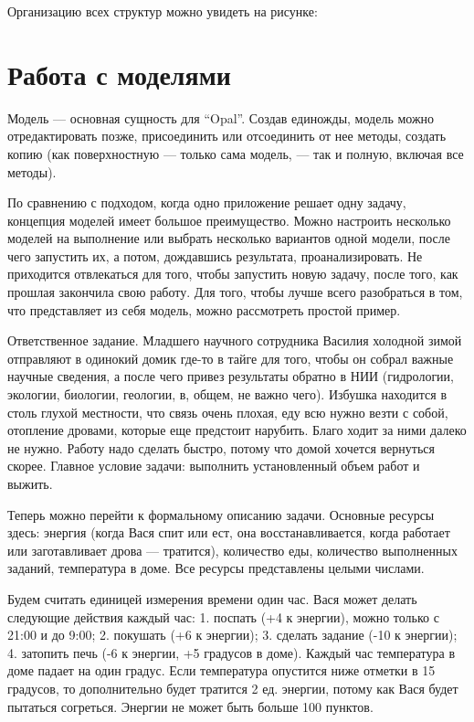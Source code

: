 Организацию всех структур можно увидеть на рисунке:

\section{Работа с моделями}

Модель — основная сущность для “Opal”. Создав единожды, модель можно отредактировать позже, присоединить или отсоединить от нее методы, создать копию (как поверхностную — только сама модель, — так и полную, включая все методы).

По сравнению с подходом, когда одно приложение решает одну задачу, концепция моделей имеет большое преимущество. Можно настроить несколько моделей на выполнение или выбрать несколько вариантов одной модели, после чего запустить их, а потом, дождавшись результата, проанализировать. Не приходится отвлекаться для того, чтобы запустить новую задачу, после того, как прошлая закончила свою работу.
Для того, чтобы лучше всего разобраться в том, что представляет из себя модель, можно рассмотреть простой пример.

Ответственное задание. Младшего научного сотрудника Василия холодной зимой отправляют в одинокий домик где-то в тайге для того, чтобы он собрал важные научные сведения, а после чего привез результаты обратно в НИИ (гидрологии, экологии, биологии, геологии, в, общем, не важно чего). Избушка находится в столь глухой местности, что связь очень плохая, еду всю нужно везти с собой, отопление дровами, которые еще предстоит нарубить. Благо ходит за ними далеко не нужно. Работу надо сделать быстро, потому что домой хочется вернуться скорее. Главное условие задачи: выполнить установленный объем работ и выжить.

Теперь можно перейти к формальному описанию задачи. Основные ресурсы здесь: энергия (когда Вася спит или ест, она восстанавливается, когда работает или заготавливает дрова — тратится), количество еды, количество выполненных заданий, температура в доме. Все ресурсы представлены целыми числами. 

Будем считать единицей измерения времени один час. Вася может делать следующие действия каждый час:
1. поспать (+4 к энергии), можно только с 21:00 и до 9:00;
2. покушать (+6 к энергии);
3. сделать задание (-10 к энергии);
4. затопить печь (-6 к энергии, +5 градусов в доме).
Каждый час температура в доме падает на один градус. Если температура опустится ниже отметки в 15 градусов, то дополнительно будет тратится 2 ед. энергии, потому как Вася будет пытаться согреться. Энергии не может быть больше 100 пунктов.

